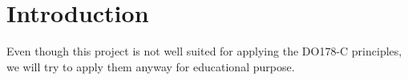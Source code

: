 \section{Introduction}



Even though this project is not well suited for applying the DO178-C principles,
we will try to apply them anyway for educational purpose.


\newpage

